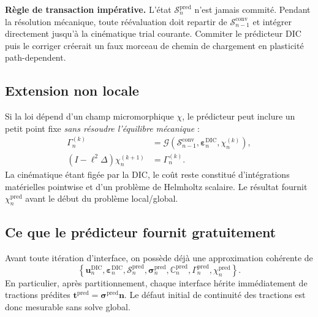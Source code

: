 \documentclass[11pt,a4paper]{article}
\newcommand{\udic}{\bm{u}^{\mathrm{DIC}}}
\newcommand{\epsdic}{\bm{\varepsilon}^{\mathrm{DIC}}}
\newcommand{\state}{\mathcal{S}}
\begin{document}
\begin{warningbox}
\textbf{Règle de transaction impérative.} L'état $\state_n^{\mathrm{pred}}$ n'est jamais commité.
Pendant la résolution mécanique, toute réévaluation doit repartir de
$\state_{n-1}^{\mathrm{conv}}$ et intégrer directement jusqu'à la cinématique trial courante.
Commiter le prédicteur DIC puis le corriger créerait un faux morceau de chemin de chargement en
plasticité path-dependent.
\end{warningbox}

\subsection{Extension non locale}

Si la loi dépend d'un champ micromorphique $\chi$, le prédicteur peut inclure un petit point fixe
\emph{sans résoudre l'équilibre mécanique} :
\begin{align}
  \Gamma_n^{(k)} &= \mathcal{G}\left(\state_{n-1}^{\mathrm{conv}},\epsdic_n,\chi_n^{(k)}\right),\\
  (I-\ell^2\Delta)\chi_n^{(k+1)} &= \Gamma_n^{(k)}.
\end{align}
La cinématique étant figée par la DIC, le coût reste constitué d'intégrations matérielles pointwise et
d'un problème de Helmholtz scalaire. Le résultat fournit $\chi_n^{\mathrm{pred}}$ avant le début du
problème local/global.

\subsection{Ce que le prédicteur fournit gratuitement}

Avant toute itération d'interface, on possède déjà une approximation cohérente de
\begin{equation}
\left\{
\udic_n,
\epsdic_n,
\state_n^{\mathrm{pred}},
\bm{\sigma}_n^{\mathrm{pred}},
\mathbb{C}_n^{\mathrm{pred}},
\Gamma_n^{\mathrm{pred}},
\chi_n^{\mathrm{pred}}
\right\}.
\end{equation}
En particulier, après partitionnement, chaque interface hérite immédiatement de tractions
prédites $\bm{t}^{\mathrm{pred}}=\bm{\sigma}^{\mathrm{pred}}\bm{n}$. Le défaut initial de continuité des
tractions est donc mesurable sans solve global.
\end{document}
